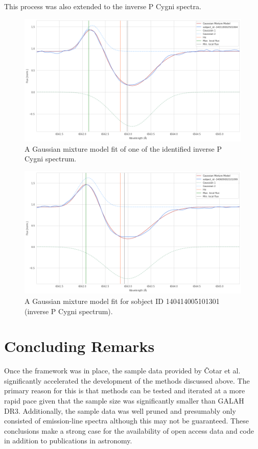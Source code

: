 This process was also extended to the inverse P Cygni spectra.

\begin{figure}[!htb]
\centering
\includegraphics[scale=0.45]{figures/inverse p cygni 1.png}
\caption{A Gaussian mixture model fit of one of the identified inverse P Cygni spectrum. }
\end{figure}

\begin{figure}[!htb]
\centering
\includegraphics[scale=0.45]{figures/inverse p cygni fitted 2.png}
\caption{A Gaussian mixture model fit for sobject ID 140414005101301 (inverse P Cygni spectrum). }
\end{figure}

\section{Concluding Remarks}

Once the framework was in place, the sample data provided by Čotar et al. significantly accelerated the development of the methods discussed above. The primary reason for this is that methods can be tested and iterated at a more rapid pace given that the sample size was significantly smaller than GALAH DR3. Additionally, the sample data was well pruned and presumably only consisted of emission-line spectra although this may not be guaranteed. These conclusions make a strong case for the availability of open access data and code in addition to publications in astronomy. 

